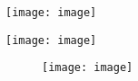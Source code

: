 \usepackage{graphicx} %
\usepackage{wrapfig} 
\graphicspath{ {./images/} } %


\texttt{[image: image]}


\texttt{[image: image]}
 


\begin{figure}[position]
    \texttt{[image: image]}
    \centering
\end{figure}


